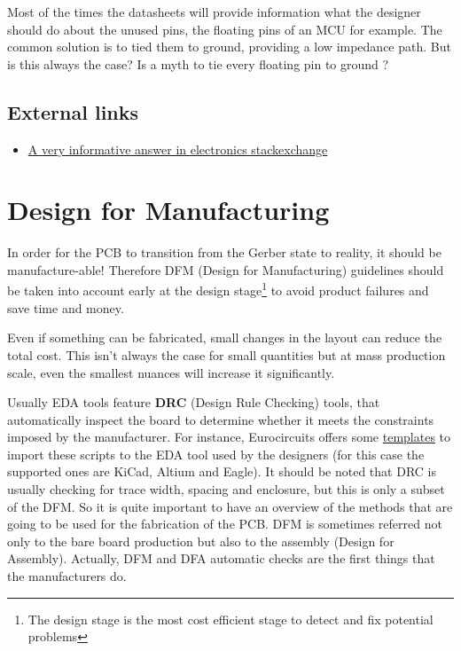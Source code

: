 \documentclass[final]{cubedoc}
\begin{document}
	Most of the times the datasheets will provide information what the designer should do about the unused pins, the floating pins of an MCU for example. The common solution is to tied them to ground, providing a low impedance path. But is this always the case? Is a myth to tie every floating pin to ground \cite{learnemc:myth, rangu2014getting}?
	
	
	\subsection{External links}
	
	\begin{itemize}
		\item \href{https://web.archive.org/web/20200815071606/https://electronics.stackexchange.com/questions/15135/decoupling-caps-pcb-layout/15143}{A very informative answer in electronics stackexchange}
	\end{itemize}
	
	\section{Design for Manufacturing}
	
	In order for the PCB to transition from the Gerber state to reality, it should be manufacture-able! Therefore DFM (Design for Manufacturing) guidelines should be taken into account early at the design stage\footnote{The design stage is the most cost efficient stage to detect and fix potential problems} to avoid product failures and save time and money. 
	
	Even if something can be fabricated, small changes in the layout can reduce the total cost. This isn't always the case for small quantities but at mass production scale, even the smallest nuances will increase it significantly. 
	
	
	Usually EDA tools feature \textbf{DRC} (Design Rule Checking) tools, that automatically inspect the board to determine whether it meets the constraints imposed by the manufacturer.
	For instance, Eurocircuits offers some \href{https://www.eurocircuits.com/drc-settings-and-guide-lines-for-cad-packages/}{templates} to import these scripts to the EDA tool used by the designers (for this case the supported ones are KiCad, Altium and Eagle). It should be noted that DRC is usually checking for trace width, spacing and enclosure, but this is only a subset of the DFM. So it is quite important to have an overview of the methods that are going to be used for the fabrication of the PCB. DFM is sometimes referred not only to the bare board production but also to the assembly (Design for Assembly). Actually, DFM and DFA automatic checks are the first things that the manufacturers do. 
	
\end{document}
